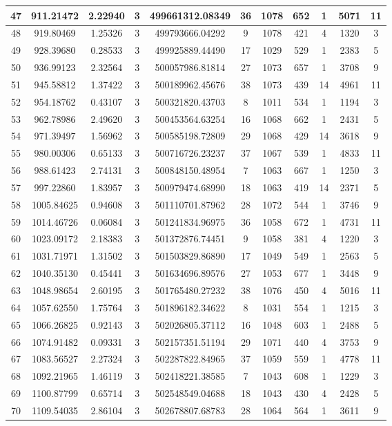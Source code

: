 \begin{longtable}{|c|c|c|c|c|c|c|c|c|c|c|}
\hline 
47&911.21472&2.22940&3&499661312.08349&36&1078&652&1&5071&11\\ 
\hline 
48&919.80469&1.25326&3&499793666.04292&9&1078&421&4&1320&3\\ 
\hline 
49&928.39680&0.28533&3&499925889.44490&17&1029&529&1&2383&5\\ 
\hline 
50&936.99123&2.32564&3&500057986.81814&27&1073&657&1&3708&9\\ 
\hline 
51&945.58812&1.37422&3&500189962.45676&38&1073&439&14&4961&11\\ 
\hline 
52&954.18762&0.43107&3&500321820.43703&8&1011&534&1&1194&3\\ 
\hline 
53&962.78986&2.49620&3&500453564.63254&16&1068&662&1&2431&5\\ 
\hline 
54&971.39497&1.56962&3&500585198.72809&29&1068&429&14&3618&9\\ 
\hline 
55&980.00306&0.65133&3&500716726.23237&37&1067&539&1&4833&11\\ 
\hline 
56&988.61423&2.74131&3&500848150.48954&7&1063&667&1&1250&3\\ 
\hline 
57&997.22860&1.83957&3&500979474.68990&18&1063&419&14&2371&5\\ 
\hline 
58&1005.84625&0.94608&3&501110701.87962&28&1072&544&1&3746&9\\ 
\hline 
59&1014.46726&0.06084&3&501241834.96975&36&1058&672&1&4731&11\\ 
\hline 
60&1023.09172&2.18383&3&501372876.74451&9&1058&381&4&1220&3\\ 
\hline 
61&1031.71971&1.31502&3&501503829.86890&17&1049&549&1&2563&5\\ 
\hline 
62&1040.35130&0.45441&3&501634696.89576&27&1053&677&1&3448&9\\ 
\hline 
63&1048.98654&2.60195&3&501765480.27232&38&1076&450&4&5016&11\\ 
\hline 
64&1057.62550&1.75764&3&501896182.34622&8&1031&554&1&1215&3\\ 
\hline 
65&1066.26825&0.92143&3&502026805.37112&16&1048&603&1&2488&5\\ 
\hline 
66&1074.91482&0.09331&3&502157351.51194&29&1071&440&4&3753&9\\ 
\hline 
67&1083.56527&2.27324&3&502287822.84965&37&1059&559&1&4778&11\\ 
\hline 
68&1092.21965&1.46119&3&502418221.38585&7&1043&608&1&1229&3\\ 
\hline 
69&1100.87799&0.65714&3&502548549.04688&18&1043&430&4&2428&5\\ 
\hline 
70&1109.54035&2.86104&3&502678807.68783&28&1064&564&1&3611&9\\ 

\end{longtable}
